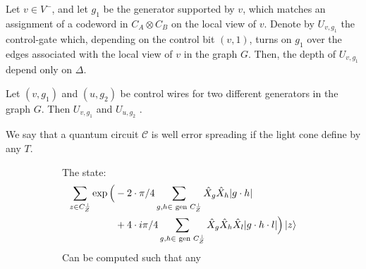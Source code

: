 \documentclass[manuscript,screen,review]{acmart}
\begin{document}
\begin{claim}
  Let $v \in V^{-}$, and let $g_{1}$ be the generator supported by $v$, which
  matches an assignment of a codeword in $C_{A}\otimes C_{B}$ on the local view
  of $v$. Denote by $U_{v, g_{1}}$ the control-gate which, depending on the
  control bit $(v,1)$, turns on $g_{1}$ over the edges associated with the local
  view of $v$ in the graph $G$. Then, the depth of $U_{v,g_{1}}$ depend only on
  $\Delta$.
\end{claim}

\begin{claim}
  Let $(v,g_{1})$ and $(u,g_{2})$ be control wires for two different generators
  in the graph $G$. Then $U_{v,g_{1}}$ and $U_{u,g_{2}}$ .
\end{claim}

\begin{definition}
  We say that a quantum circuit $\mathcal{C}$ is well error spreading if the
  light cone define by any $T$.
\end{definition}

%
\begin{figure}[h]
  \begin{subfigure}[b]{0.45\textwidth}
    \begin{claim}
      The state:
      \begin{equation*}
        \begin{split}
          \sum_{z \in C_{Z}^{\perp}}  \exp \Big(  & -  2 \cdot \pi/4 \sum_{g ,h
            \in \text{ gen } C_{Z}^{\perp}} \hat{X}_{g}\hat{X}_{h}|g\cdot h| \\
            & +  4 \cdot i\pi/4 \sum_{g,h \in \text{ gen } C_{Z}^{\perp}}
          \hat{X}_{g}\hat{X}_{h}\hat{X}_{l}|g\cdot h \cdot l|  \Big) \ket{z}
        \end{split}
      \end{equation*}
      Can be computed such that any
    \end{claim}
  \end{subfigure}
  \begin{subfigure}[b]{0.05\textwidth}
    \
  \end{subfigure}
  \begin{subfigure}[b]{0.45\textwidth}
  \end{subfigure}
\end{figure}
\end{document}
